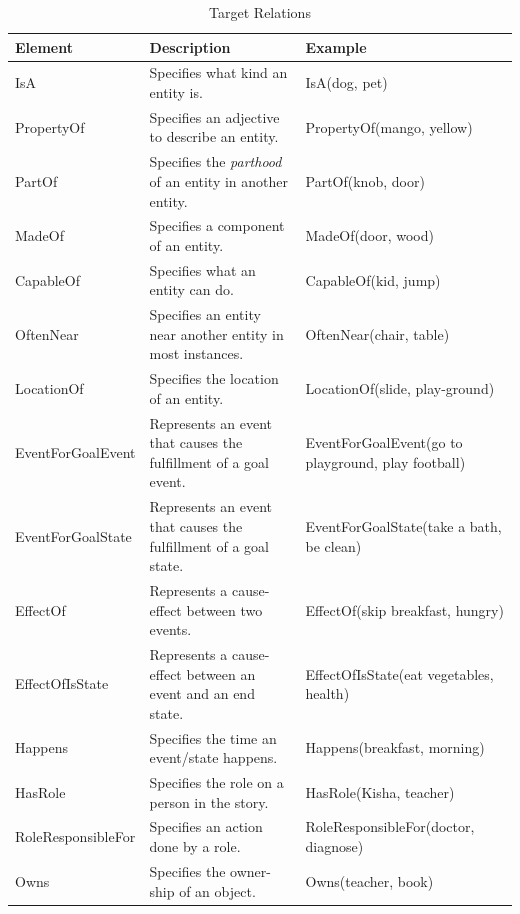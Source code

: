 \begin{table}[H]   %
\centering
\caption{Target Relations} \vspace{0.25em}
\begin{tabular}{|p{3.5cm}|p{4cm}|p{5.5cm}|} \hline
\textbf{Element} & \textbf{Description} & \textbf{Example} \\ \hline
IsA					& Specifies what kind an entity is. & IsA(dog, pet) \\ \hline
PropertyOf			& Specifies an adjective to describe an entity. & PropertyOf(mango, yellow) \\ \hline
PartOf				& Specifies the \textit{parthood} of an entity in another entity. & PartOf(knob, door) \\ \hline
MadeOf				& Specifies a component of an entity. & MadeOf(door, wood) \\ \hline
CapableOf			& Specifies what an entity can do. & CapableOf(kid, jump) \\ \hline
OftenNear			& Specifies an entity near another entity in most instances. & OftenNear(chair, table) \\ \hline
LocationOf			& Specifies the location of an entity. & LocationOf(slide, play-ground) \\ \hline
EventForGoalEvent	& Represents an event that causes the fulfillment of a goal event. & EventForGoalEvent(go to playground, play football) \\ \hline
EventForGoalState	& Represents an event that causes the fulfillment of a goal state. & EventForGoalState(take a bath, be clean) \\ \hline
EffectOf			& Represents a cause-effect between two events. & EffectOf(skip breakfast, hungry) \\ \hline
EffectOfIsState		& Represents a cause-effect between an event and an end state. & EffectOfIsState(eat vegetables, health) \\ \hline
Happens				& Specifies the time an event/state happens. & Happens(breakfast, morning) \\ \hline
HasRole				& Specifies the role on a person in the story. & HasRole(Kisha, teacher) \\ \hline
RoleResponsibleFor	& Specifies an action done by a role. & RoleResponsibleFor(doctor, diagnose) \\ \hline
Owns				& Specifies the owner-ship of an object. & Owns(teacher, book) \\ \hline
\end{tabular}
\label{tab:targetrel}
\end{table}

